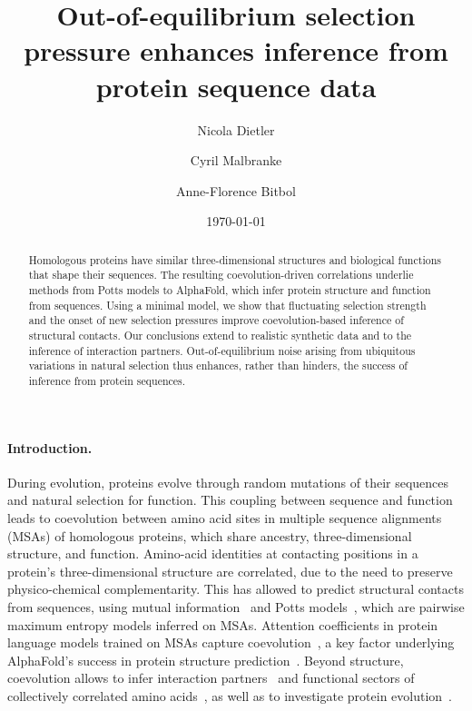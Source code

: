 \documentclass[
 reprint,








nobibnotes,

 amsmath,amssymb,
 aps,
 prl,
 longbibliography






]{revtex4-2}
\begin{document}

\title{Out-of-equilibrium selection pressure enhances inference from protein sequence data}
\author{Nicola Dietler}
\author{Cyril Malbranke}
\author{Anne-Florence Bitbol}
\date{\today}

\begin{abstract}
Homologous proteins have similar three-dimensional structures and biological functions that shape their sequences. The resulting coevolution-driven correlations underlie methods from Potts models to AlphaFold, which infer protein structure and function from sequences. Using a minimal model, we show that fluctuating selection strength and the onset of new selection pressures improve coevolution-based inference of structural contacts. Our conclusions extend to realistic synthetic data and to the inference of interaction partners. Out-of-equilibrium noise arising from ubiquitous variations in natural selection thus enhances, rather than hinders, the success of inference from protein sequences.
\end{abstract}

\maketitle

\paragraph*{Introduction.}
During evolution, proteins evolve through random mutations of their sequences and natural selection for function. This coupling between sequence and function leads to coevolution between amino acid sites in multiple sequence alignments (MSAs) of homologous proteins, which share ancestry, three-dimensional structure, and function. Amino-acid identities at contacting positions in a protein's three-dimensional structure are correlated, due to the need to preserve physico-chemical complementarity. This has allowed to predict structural contacts from sequences, using mutual information~\cite{Dunn08} and Potts models~\cite{Weigt09,Morcos11,Marks11,Barton16}, which are pairwise maximum entropy models inferred on MSAs. Attention coefficients in protein language models trained on MSAs capture coevolution~\cite{rao2021msa,Jumper21}, a key factor underlying AlphaFold's success in protein structure prediction~\cite{Jumper21}. Beyond structure, coevolution allows to infer interaction partners~\cite{Burger08,Bitbol16,Bitbol18,Lupo24} and functional sectors of collectively correlated amino acids~\cite{Halabi09,Rivoire16,Wang19,Dietler24}, as well as to investigate protein evolution~\cite{delaPaz20,DiBari24,DeLeonardis25,biswas_kinetic_2024,gizzio_evolutionary_2024,alvarez_vivo_2024}.
\end{document}
